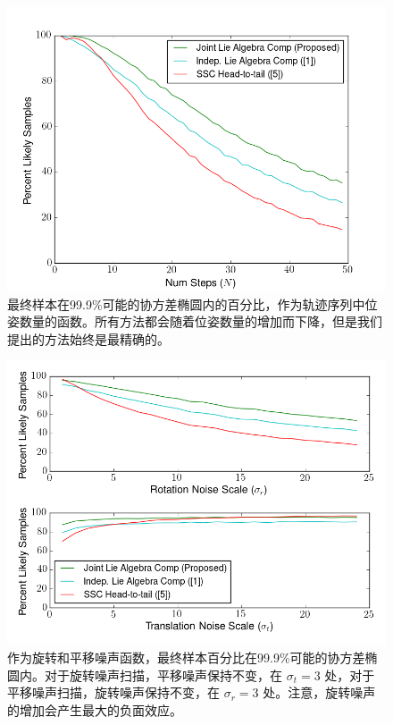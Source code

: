 \begin{figure}[t]
    \centering
    \includegraphics[width=\columnwidth]{figures/compose_num_steps.png}
    \caption{最终样本在99.9\%可能的协方差椭圆内的百分比，作为轨迹序列中位姿数量的函数。所有方法都会随着位姿数量的增加而下降，但是我们提出的方法始终是最精确的。}
    \label{fig:compose_num_steps}
\end{figure}
\begin{figure}[t]
    \centering
    \includegraphics[width=\columnwidth]{figures/compose_noise.png}
    \caption{作为旋转和平移噪声函数，最终样本百分比在99.9\%可能的协方差椭圆内。对于旋转噪声扫描，平移噪声保持不变，在 $\sigma_t=3$ 处，对于平移噪声扫描，旋转噪声保持不变，在 $\sigma_r=3$ 处。注意，旋转噪声的增加会产生最大的负面效应。}
    \label{fig:compose_noise}
\end{figure}

